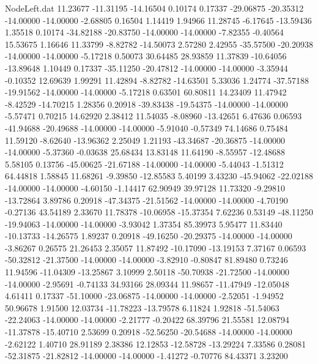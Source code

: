 \begin{filecontents}{NodeLeft.dat}
  11.23677  -11.31195  -14.16504     0.10174    0.17337  -29.06875  -20.35312  -14.00000  -14.00000   -2.68805    0.16504    1.14419    1.94966
  11.28745   -6.17645  -13.59436     1.35518    0.10174  -34.82188  -20.83750  -14.00000  -14.00000   -7.82355   -0.40564   15.53675    1.16646
  11.33799   -8.82782  -14.50073     2.57280    2.42955  -35.57500  -20.20938  -14.00000  -14.00000   -5.17218    0.50073   30.64485   28.93859
  11.37839  -10.64056  -13.89648     1.10449    0.17337  -35.11250  -20.47812  -14.00000  -14.00000   -3.35944   -0.10352   12.69639    1.99291
  11.42894   -8.82782  -14.63501     5.33036    1.24774  -37.57188  -19.91562  -14.00000  -14.00000   -5.17218    0.63501   60.80811   14.23409
  11.47942   -8.42529  -14.70215     1.28356    0.20918  -39.83438  -19.54375  -14.00000  -14.00000   -5.57471    0.70215   14.62920    2.38412
  11.54035   -8.08960  -13.42651     6.47636    0.06593  -41.94688  -20.49688  -14.00000  -14.00000   -5.91040   -0.57349   74.14686    0.75484
  11.59120   -8.62640  -13.96362     2.25049    1.21193  -43.34687  -20.36875  -14.00000  -14.00000   -5.37360   -0.03638   25.68434   13.83148
  11.64190   -8.55957  -12.48688     5.58105    0.13756  -45.00625  -21.67188  -14.00000  -14.00000   -5.44043   -1.51312   64.44818    1.58845
  11.68261   -9.39850  -12.85583     5.40199    3.43230  -45.94062  -22.02188  -14.00000  -14.00000   -4.60150   -1.14417   62.90949   39.97128
  11.73320   -9.29810  -13.72864     3.89786    0.20918  -47.34375  -21.51562  -14.00000  -14.00000   -4.70190   -0.27136   43.54189    2.33670
  11.78378  -10.06958  -15.37354     7.62236    0.53149  -48.11250  -19.94063  -14.00000  -14.00000   -3.93042    1.37354   85.39973    5.95477
  11.83440  -10.13733  -14.26575     1.89237    0.20918  -49.16250  -20.29375  -14.00000  -14.00000   -3.86267    0.26575   21.26453    2.35057
  11.87492  -10.17090  -13.19153     7.37167    0.06593  -50.32812  -21.37500  -14.00000  -14.00000   -3.82910   -0.80847   81.89480    0.73246
  11.94596  -11.04309  -13.25867     3.10999    2.50118  -50.70938  -21.72500  -14.00000  -14.00000   -2.95691   -0.74133   34.93166   28.09344
  11.98657  -11.47949  -12.05048     4.61411    0.17337  -51.10000  -23.06875  -14.00000  -14.00000   -2.52051   -1.94952   50.96678    1.91500
  12.03734  -11.78223  -13.79578     6.11824    1.92818  -51.54063  -22.24063  -14.00000  -14.00000   -2.21777   -0.20422   68.39796   21.55581
  12.08794  -11.37878  -15.40710     2.53699    0.20918  -52.56250  -20.54688  -14.00000  -14.00000   -2.62122    1.40710   28.91189    2.38386
  12.12853  -12.58728  -13.29224     7.33586    0.28081  -52.31875  -21.82812  -14.00000  -14.00000   -1.41272   -0.70776   84.43371    3.23200

\end{filecontents}
